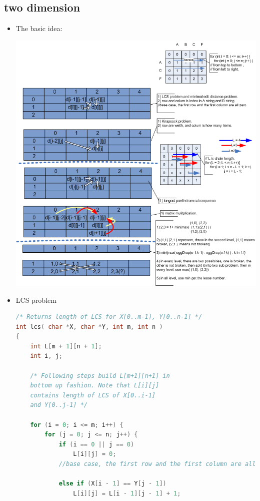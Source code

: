 \documentclass[a4paper,11pt,twoside]{book}
\begin{document}
\subsection{two dimension}

\begin{itemize}
\item The basic idea: \newline

\includegraphics[scale=0.65]{pics/two_dimension.png} \newline

\item LCS problem 
\begin{lstlisting}[frame=single, language=c++]
/* Returns length of LCS for X[0..m-1], Y[0..n-1] */
int lcs( char *X, char *Y, int m, int n ) 
{ 
	int L[m + 1][n + 1]; 
	int i, j; 
	
	/* Following steps build L[m+1][n+1] in 
	bottom up fashion. Note that L[i][j] 
	contains length of LCS of X[0..i-1]
	and Y[0..j-1] */
	
	for (i = 0; i <= m; i++) { 
		for (j = 0; j <= n; j++) { 
			if (i == 0 || j == 0)  
				L[i][j] = 0;   
			//base case, the first row and the first column are all zero
			
			else if (X[i - 1] == Y[j - 1]) 
				L[i][j] = L[i - 1][j - 1] + 1; 
			

\end{lstlisting}
\end{itemize}
\end{document}
